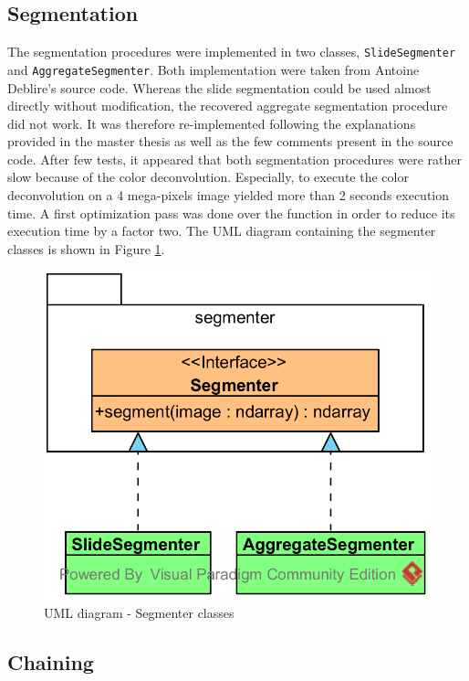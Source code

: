 \subsection{Segmentation}

The segmentation procedures were implemented in two classes, \texttt{SlideSegmenter} and \texttt{AggregateSegmenter}. Both implementation were taken from Antoine Deblire's source code. Whereas the slide segmentation could be used almost directly without modification, the recovered aggregate segmentation procedure did not work. It was therefore re-implemented following the explanations provided in the master thesis as well as the few comments present in the source code. After few tests, it appeared that both segmentation procedures were rather slow because of the color deconvolution. Especially, to execute the color deconvolution on a 4 mega-pixels image yielded more than 2 seconds execution time. A first optimization pass was done over the function in order to reduce its execution time by a factor two. The UML diagram containing the segmenter classes is shown in Figure \ref{fig:uml_cyto_segmenters}.

\begin{figure}
	\center
	\includegraphics[scale=0.85]{image/thyroid_segmenters.png}
	\caption{UML diagram - Segmenter classes}
	\label{fig:uml_cyto_segmenters}
\end{figure}

\subsection{Chaining}

